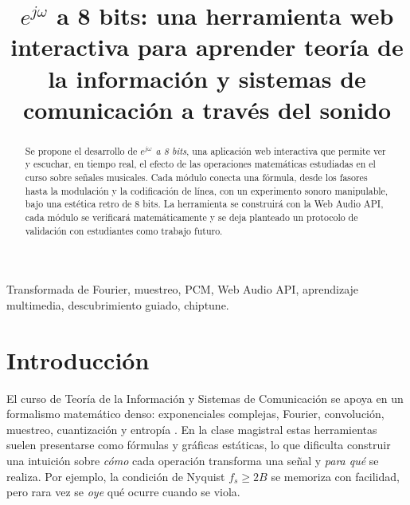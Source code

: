 \documentclass[conference]{IEEEtran}
\begin{document}
\title{$e^{j\omega}$ a 8 bits: una herramienta web interactiva para aprender teoría de la información y sistemas de comunicación a través del sonido}

\author{
}

\maketitle

\begin{abstract}
Se propone el desarrollo de \emph{$e^{j\omega}$ a 8 bits}, una aplicación web interactiva que permite ver y escuchar, en tiempo real, el efecto de las operaciones matemáticas estudiadas en el curso sobre señales musicales. Cada módulo conecta una fórmula, desde los fasores hasta la modulación y la codificación de línea, con un experimento sonoro manipulable, bajo una estética retro de 8 bits. La herramienta se construirá con la Web Audio API, cada módulo se verificará matemáticamente y se deja planteado un protocolo de validación con estudiantes como trabajo futuro.
\end{abstract}

\begin{IEEEkeywords}
Transformada de Fourier, muestreo, PCM, Web Audio API, aprendizaje multimedia, descubrimiento guiado, chiptune.
\end{IEEEkeywords}

\section{Introducción}
El curso de Teoría de la Información y Sistemas de Comunicación se apoya en un formalismo matemático denso: exponenciales complejas, Fourier, convolución, muestreo, cuantización y entropía \citep{lathi2019,haykin2009}. En la clase magistral estas herramientas suelen presentarse como fórmulas y gráficas estáticas, lo que dificulta construir una intuición sobre \emph{cómo} cada operación transforma una señal y \emph{para qué} se realiza. Por ejemplo, la condición de Nyquist $f_s \geq 2B$ se memoriza con facilidad, pero rara vez se \emph{oye} qué ocurre cuando se viola.
\end{document}
